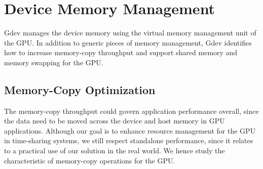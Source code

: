 \vspace{-0.25em}
\section{Device Memory Management}
\label{sec:memory_management}
\vspace{-0.25em}

Gdev manages the device memory using the virtual memory management unit
of the GPU.
In addition to generic pieces of memory management, Gdev
identifies how to increase memory-copy throughput and support shared
memory and memory swapping for the GPU.

\vspace{-0.25em}
\subsection{Memory-Copy Optimization}
\label{sec:memory_copy}
\vspace{-0.25em}

The memory-copy throughput could govern application performance overall,
since the data need to be moved across the device and host memory in GPU
applications.
Although our goal is to enhance resource management for the GPU in
time-sharing systems, we still respect standalone performance, since it
relates to a practical use of our solution in the real world.
We hence study the characteristic of memory-copy operations for the GPU.

\begin{comment}
It should be noted that our problem is different from those considered
in previous work~\cite{Jablin_PLDI11, Rossbach_SOSP11} in that we are
looking into a basic single instance of memory-copy transaction, while
the previous work addressed more applied situations where multiple
contexts compete for memory-copy transaction.

First of all, we have found that the memory-copy API functions provided
by proprietary software~\cite{CUDA40} are well-optimized for standalone
operations.
In the following, hence, we disclose how to realize this optimization.
\end{comment}


